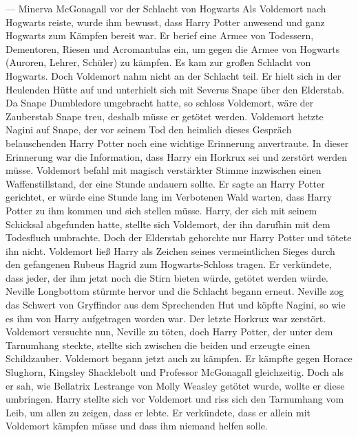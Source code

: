 \documentclass[a4paper, 10pt]{article}
\begin{document}
\newline
{}  
— Minerva McGonagall vor der Schlacht von Hogwarts
\vspace{10pt}
\newline
{}  
Als Voldemort nach Hogwarts reiste, wurde ihm bewusst, dass Harry Potter anwesend und ganz Hogwarts zum Kämpfen bereit war. Er berief eine Armee von Todessern, Dementoren, Riesen und Acromantulas ein, um gegen die Armee von Hogwarts (Auroren, Lehrer, Schüler) zu kämpfen. Es kam zur großen Schlacht von Hogwarts. Doch Voldemort nahm nicht an der Schlacht teil. Er hielt sich in der Heulenden Hütte auf und unterhielt sich mit Severus Snape über den Elderstab. Da Snape Dumbledore umgebracht hatte, so schloss Voldemort, wäre der Zauberstab Snape treu, deshalb müsse er getötet werden. Voldemort hetzte Nagini auf Snape, der vor seinem Tod den heimlich dieses Gespräch belauschenden Harry Potter noch eine wichtige Erinnerung anvertraute. In dieser Erinnerung war die Information, dass Harry ein Horkrux sei und zerstört werden müsse. Voldemort befahl mit magisch verstärkter Stimme inzwischen einen Waffenstillstand, der eine Stunde andauern sollte. Er sagte an Harry Potter gerichtet, er würde eine Stunde lang im Verbotenen Wald warten, dass Harry Potter zu ihm kommen und sich stellen müsse. Harry, der sich mit seinem Schicksal abgefunden hatte, stellte sich Voldemort, der ihn darufhin mit dem Todesfluch umbrachte. Doch der Elderstab gehorchte nur Harry Potter und tötete ihn nicht. Voldemort ließ Harry als Zeichen seines vermeintlichen Sieges durch den gefangenen Rubeus Hagrid zum Hogwarts-Schloss tragen. Er verkündete, dass jeder, der ihm jetzt noch die Stirn bieten würde, getötet werden würde. Neville Longbottom stürmte hervor und die Schlacht begann erneut. Neville zog das Schwert von Gryffindor aus dem Sprechenden Hut und köpfte Nagini, so wie es ihm von Harry aufgetragen worden war. Der letzte Horkrux war zerstört. Voldemort versuchte nun, Neville zu töten, doch Harry Potter, der unter dem Tarnumhang steckte, stellte sich zwischen die beiden und erzeugte einen Schildzauber. Voldemort begann jetzt auch zu kämpfen. Er kämpfte gegen Horace Slughorn, Kingsley Shacklebolt und Professor McGonagall gleichzeitig. Doch als er sah, wie Bellatrix Lestrange von Molly Weasley getötet wurde, wollte er diese umbringen. Harry stellte sich vor Voldemort und riss sich den Tarnumhang vom Leib, um allen zu zeigen, dass er lebte. Er verkündete, dass er allein mit Voldemort kämpfen müsse und dass ihm niemand helfen solle.
\vspace{10pt}
\end{document}
